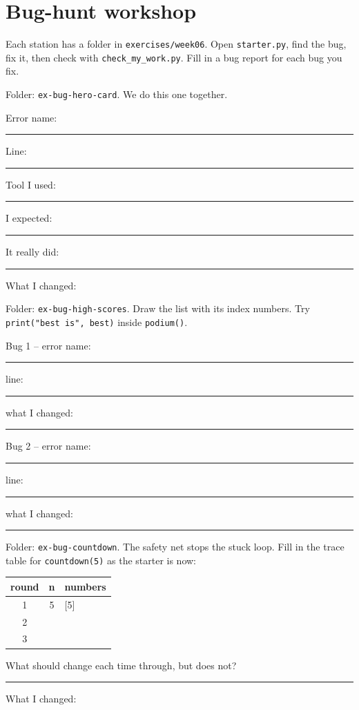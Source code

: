 \section{Bug-hunt workshop}
Each station has a folder in \texttt{exercises/week06}. Open \texttt{starter.py}, find the bug, fix it, then check with \texttt{check\_my\_work.py}.
Fill in a bug report for each bug you fix.

\begin{exercise}
Folder: \texttt{ex-bug-hero-card}. We do this one together.\par
Error name: \rule{4cm}{0.4pt}\quad Line: \rule{1.5cm}{0.4pt}\quad Tool I used: \rule{3.5cm}{0.4pt}\par
I expected: \rule{5cm}{0.4pt}\quad It really did: \rule{5cm}{0.4pt}\par
What I changed: 
\end{exercise}

\begin{exercise}
Folder: \texttt{ex-bug-high-scores}. Draw the list with its index numbers. Try \texttt{print("best is", best)} inside \texttt{podium()}.\par
Bug 1 -- error name: \rule{3.5cm}{0.4pt}\quad line: \rule{1.5cm}{0.4pt}\quad what I changed: \rule{5cm}{0.4pt}\par
Bug 2 -- error name: \rule{3.5cm}{0.4pt}\quad line: \rule{1.5cm}{0.4pt}\quad what I changed: \rule{5cm}{0.4pt}
\end{exercise}

\begin{exercise}
Folder: \texttt{ex-bug-countdown}. The safety net stops the stuck loop. Fill in the trace table for \texttt{countdown(5)} as the starter is now:
\begin{center}
\renewcommand{\arraystretch}{1.4}
\begin{tabular}{|c|c|p{4cm}|}
\hline \textbf{round} & \textbf{n} & \textbf{numbers} \\ \hline
1 & 5 & [5] \\ \hline
2 & & \\ \hline
3 & & \\ \hline
\end{tabular}
\end{center}
What should change each time through, but does not? \rule{6cm}{0.4pt}\par
What I changed: 
\end{exercise}

